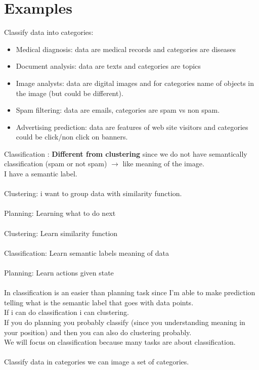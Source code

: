 \documentclass[../main.tex]{subfiles}
\begin{document}
\section{Examples}
Classify data into categories:\\
\begin{itemize}
\item Medical diagnosis: data are medical records and categories are diseases
\item Document analysis: data are texts and categories are topics
\item Image analysts: data are digital images and for categories name of objects
in the image (but could be different).
\item Spam filtering: data are emails, categories are spam vs non spam.
\item Advertising prediction: data are features of web site visitors and categories
could be click/non click on banners.
\end{itemize}
Classification : \textbf{ Different from clustering }since we do not have semantically
classification (spam or not spam) $\rightarrow$ like meaning of the image.\\
I have a semantic label.
\\\\
Clustering: i want to group data with similarity function. \\\\
Planning: Learning what to do next \\\\
Clustering: Learn similarity function \\\\
Classification: Learn semantic labels meaning of data\\\\
Planning: Learn actions given state\\\\
In classification is an easier than planning task since I’m able to make
prediction telling what is the semantic label that goes with data points.\\
If i can do classification i can clustering.\\
If you do planning you probably classify (since you understanding meaning in
your position) and then you can also do clustering probably.\\
We will focus on classification because many tasks are about classification.\\\\
Classify data in categories we can image a set of categories.\\
\end{document}

